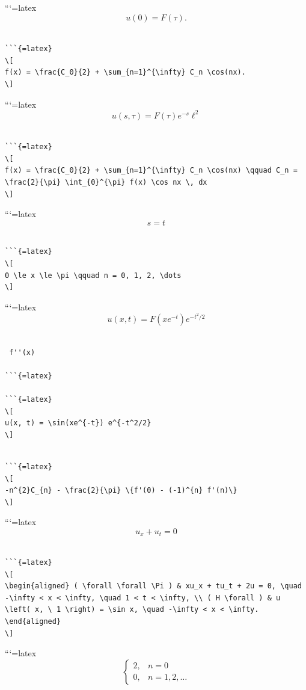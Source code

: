 \documentclass[
]{article}
\begin{document}
```{=latex}
\[
u(0) = F(\tau).
\]

\begin{verbatim}

```{=latex}
\[
f(x) = \frac{C_0}{2} + \sum_{n=1}^{\infty} C_n \cos(nx).
\]
\end{verbatim}

```{=latex}
\[
u(s, \tau) = F(\tau) e^{-s} \ell^2
\]

\begin{verbatim}

```{=latex}
\[
f(x) = \frac{C_0}{2} + \sum_{n=1}^{\infty} C_n \cos(nx) \qquad C_n = \frac{2}{\pi} \int_{0}^{\pi} f(x) \cos nx \, dx
\]
\end{verbatim}

```{=latex}
\[
s=t
\]

\begin{verbatim}

```{=latex}
\[
0 \le x \le \pi \qquad n = 0, 1, 2, \dots
\]
\end{verbatim}

```{=latex}
\[
u(x, t) = F(xe^{-t}) e^{-t^2/2}
\]

\begin{verbatim}

 f''(x)

```{=latex}

```{=latex}
\[
u(x, t) = \sin(xe^{-t}) e^{-t^2/2}
\]
\end{verbatim}

\begin{verbatim}

```{=latex}
\[
-n^{2}C_{n} - \frac{2}{\pi} \{f'(0) - (-1)^{n} f'(n)\}
\]
\end{verbatim}

```{=latex}
\[
u_x + u_t = 0
\]

\begin{verbatim}

```{=latex}
\[
\begin{aligned} ( \forall \forall \Pi ) & xu_x + tu_t + 2u = 0, \quad -\infty < x < \infty, \quad 1 < t < \infty, \\ ( H \forall ) & u \left( x, \ 1 \right) = \sin x, \quad -\infty < x < \infty. \end{aligned}
\]
\end{verbatim}

```{=latex}
\[
\begin{cases} 2, &n=0 \\ 0, &n=1, 2, \dots \end{cases}
\]
\end{document}
